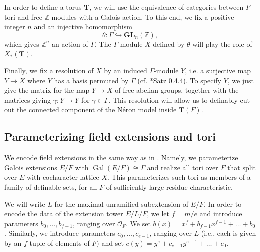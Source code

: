 \documentclass{amsart}
\newcommand{\Z}{{\mathbb Z}}
\newcommand{\ri}{\mathcal{O}}
\DeclareMathOperator{\gal}{Gal}
\newcommand{\GL}{\mathbf {GL}}
\newcommand{\bT}{\mathbf {T}}
\theoremstyle{plain}
\theoremstyle{definition}
\begin{document}
In order to define a torus $\bT$, we will use the equivalence of categories between $F$-tori and
free $\Z$-modules with a Galois action.  To this end, we fix a positive integer $n$ and an injective homomorphism
\begin{equation} \label{eq:theta}
\theta : \Gamma \hookrightarrow \GL_n(\Z),
\end{equation}
which gives $\Z^n$ an action of $\Gamma$.  The $\Gamma$-module $X$ defined by $\theta$ will play the role of $X_\ast(\bT)$.

Finally, we fix a resolution of $X$ by an induced $\Gamma$-module $Y$, i.e. a surjective map
$Y \to X$ where $Y$ has a basis permuted by $\Gamma$ (cf. \cite{brahm:thesis}*{Satz 0.4.4}).
To specify $Y$, we just give the matrix for the map $Y \to X$ of free abelian groups,
together with the matrices giving $\gamma : Y \to Y$ for $\gamma \in \Gamma$.
This resolution will allow us to definably cut out the connected component of the N\'eron model inside $\bT(F)$.

\subsection{Parameterizing field extensions and tori}\label{sub:def_tori}
 
We encode field extensions in the same way as in \cite{cluckers-gordon-halupczok:14b}.
Namely, we parameterize Galois extensions $E/F$ with $\gal(E/F) \cong \Gamma$
and realize all tori over $F$ that split over $E$ with cocharacter lattice $X$.
This parameterizes such tori as members of a family of definable sets,
for all $F$ of sufficiently large residue characteristic. 

We will write $L$ for the maximal unramified subextension of $E/F$.  In order to encode the data of the extension tower $E/L/F$,
we let $f=m/e$ and introduce parameters $b_0,\dots, b_{f-1}$, ranging over $\ri_F$.
We set $b(x)=x^f+b_{f-1}x^{f-1}+ \dots + b_0$. 
Similarly, we introduce parameters $c_0, \dots, c_{e-1}$, ranging over $L$
(i.e., each is given by an $f$-tuple of elements of $F$) and set $c(y) = y^e + c_{e-1}y^{e-1} + \dots + c_0$.
\end{document}
